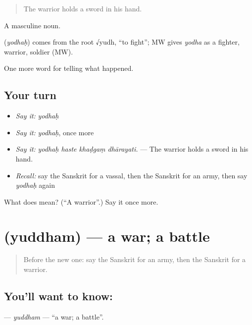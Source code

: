 \begin{quote}
The warrior holds a sword in his hand.
\end{quote}

A masculine noun.

\begin{cousinweb}
\textbf{} (\emph{yodhaḥ}) comes from the root √yudh, \textquotedblleft{}to fight\textquotedblright{}; MW gives \emph{yodha} as a fighter, warrior, soldier (MW).
\end{cousinweb}

\begin{grammarlens}[title={What you've built}]
One more word for telling what happened.
\end{grammarlens}

\subsection*{Your turn}
\begin{itemize}
\raggedright
  \item \emph{Say it:} \emph{yodhaḥ}
  \item \emph{Say it:} \emph{yodhaḥ}, once more
  \item \emph{Say it:} \emph{yodhaḥ haste khaḍgaṃ dhārayati.} — The warrior holds a sword in his hand.
  \item \emph{Recall:} say the Sanskrit for a vassal, then the Sanskrit for an army, then say \emph{yodhaḥ} again
\end{itemize}

\begin{tcolorbox}[breakable,colback=teal!4,colframe=teal!35!black,title={Before you move on}]
What does  mean? (\textquotedblleft{}A warrior\textquotedblright{}.) Say it once more.
\end{tcolorbox}
\section[\texorpdfstring{\sk{युद्धम्} (yuddham)}{युद्धम् (yuddham)}]{ (yuddham) — a war; a battle}

\label{lesson:SA-C318-yuddham}



\begin{quote}
Before the new one: say the Sanskrit for an army, then the Sanskrit for a warrior.
\end{quote}

\subsection*{You'll want to know: }
\textbf{} — \emph{yuddham} — \textquotedblleft{}a war; a battle\textquotedblright{}.

